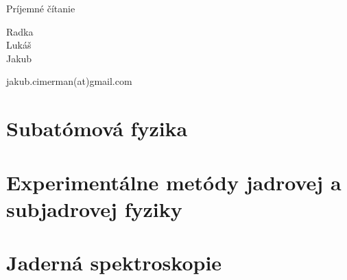 \documentclass[12pt]{book}
\begin{document}
Príjemné čítanie

\begin{flushright}
Radka\\
Lukáš\\
Jakub
\end{flushright}

\vspace{5cm}
jakub.cimerman(at)gmail.com

\newpage

\tableofcontents

\newpage

\part{Subatómová fyzika}

















\part{Experimentálne metódy jadrovej a subjadrovej fyziky}















\part{Jaderná spektroskopie}


\end{document}
